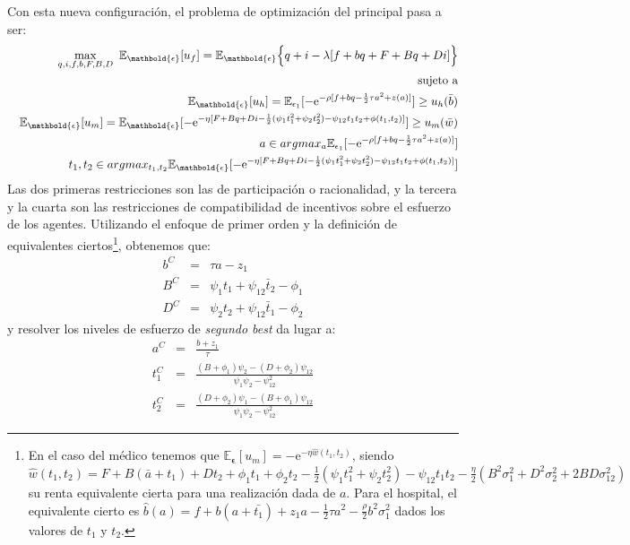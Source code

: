 ﻿\documentclass[12pt,letterpaper]{article}
\newcommand{\e}{\mathrm{e}}
\begin{document}
Con esta nueva configuraci\'on, el problema de optimizaci\'on del principal pasa a ser:
\begin{eqnarray*}
\nonumber   && \max\limits_{q,i,f,b,F,B,D}\
\mathbb{E}_{\mathbold{\epsilon}}[u_f]=\mathbb{E}_{\mathbold{\epsilon}}\text{\Big{\{}}q+i-\lambda[f+bq+
F+Bq+Di]\text{\Big{\}}}\\
\nonumber &&\text{sujeto a}\\
&&\mathbb{E}_{\mathbold{\epsilon}}[u_h]=\mathbb{E}_{\epsilon_1}[-\e^{-\rho[f+bq-\frac{1}{2}\tau
a^2+z(a)]}]
\geq u_h(\bar{b})\label{ir_h}\\
&&\mathbb{E}_{\mathbold{\epsilon}}[u_m]=\mathbb{E}_{\mathbold{\epsilon}}[-\e^{-\eta[F+Bq+Di-\frac{1}{2}(\psi_1t_1^2+
\psi_2t_2^2)-\psi_{12}t_1t_2+\phi(t_1,t_2)]}] \geq u_m(\bar{w})\label{ir_m}\\
&&a\in argmax_{a}\mathbb{E}_{\epsilon_1}[-\e^{-\rho[f+bq-\frac{1}{2}\tau
a^2+z(a)]}]\label{ic_h}\\
&&t_1,t_2 \in argmax_{t_1,t_2}\mathbb{E}_{\mathbold{\epsilon}}[-\e^{-\eta[F+Bq+Di-\frac{1}{2}(\psi_1t_1^2+ \psi_2t_2^2)-\psi_{12}t_1t_2+\phi(t_1,t_2)]}]\label{ic_m}
\end{eqnarray*}
Las dos primeras restricciones son las de participaci\'on o racionalidad, y la tercera y la cuarta son las restricciones de compatibilidad de incentivos sobre el esfuerzo de los agentes. Utilizando el enfoque de primer orden y la definici\'on de equivalentes ciertos\footnote{En el caso del m\'edico tenemos que $\mathbb{E}_{\mathbold{\epsilon}}[u_m]=-\e^{-\eta\widehat{w}(t_1,t_2)}$, siendo $\widehat{w}(t_1,t_2)=F+B(\bar{a}+t_1)+Dt_2+\phi_1t_1+\phi_2t_2-\frac{1}{2}(\psi_1t_1^2+\psi_2t_2^2)-\psi_{12}t_1t_2-\frac{\eta}{2}(B^2\sigma_1^2+D^2\sigma_2^2+2BD\sigma_{12}^2)$ su renta equivalente cierta para una realizaci\'on dada de $a$. Para el hospital, el equivalente cierto es $ \widehat{b}(a)=f+b(a+\bar{t_1})+z_1a-\frac{1}{2}\tau a^2-\frac{\rho}{2}b^2\sigma_1^2$ dados los valores de $t_1$ y $t_2$.}, obtenemos que:
\begin{eqnarray*}
b^C&=&\tau a-z_1\\
B^C&=&\psi_1t_1+\psi_{12}\bar{t}_2-\phi_1\\
D^C&=&\psi_2t_2 +\psi_{12}\bar{t}_1-\phi_2
\end{eqnarray*}
y resolver los niveles de esfuerzo de \emph{segundo best} da lugar a:
\begin{eqnarray}
a^{C}&=&\frac{b+z_1}{\tau}\label{aso}\\
t_1^{C}&=&\frac{(B+\phi_1)\psi_2-(D+\phi_2)\psi_{12}}{\psi_1\psi_2-\psi_{12}^2}\label{t1so}\\
t_{{2}}^{C}&=&\frac { \left( D+\phi_{{2}} \right) \psi_{{1}}- \left( B+\phi _{{1}} \right)\psi_{{12}}}{\psi_1\psi_2-\psi_{12}^2}\label{t2so}
\end{eqnarray}
\end{document}
